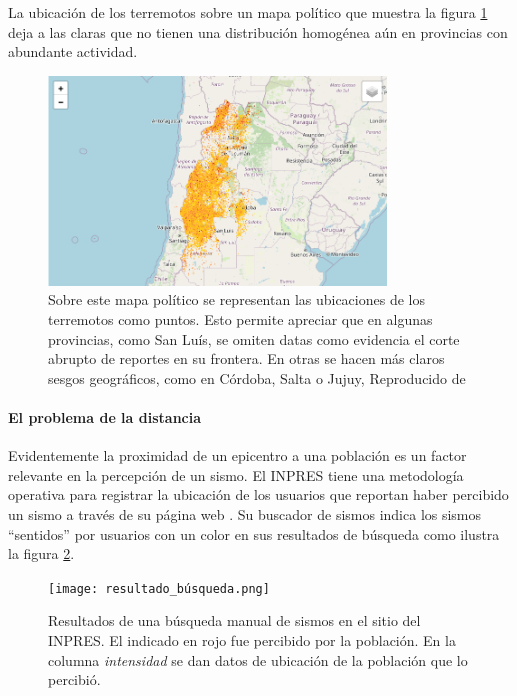 \documentclass[a4paper]{report}
\begin{document}
La ubicación de los terremotos sobre un mapa político que muestra la figura \ref{fig:terremotosMapa} deja a las claras que no tienen una distribución homogénea aún en provincias con abundante actividad.
\begin{figure}[!ht]
\centering
\includegraphics[width=0.8\textwidth]{terremotosMapa.png}
\caption{Sobre este mapa político se representan las ubicaciones de los terremotos como puntos. Esto permite apreciar que en algunas provincias, como San Luís, se omiten datas como evidencia el corte abrupto de reportes en su frontera. En otras se hacen más claros sesgos geográficos, como en Córdoba, Salta o Jujuy, 
Reproducido de \cite{daniela_parada_ic-datasets-docencia_nodate}}
\label{fig:terremotosMapa}
\end{figure}



\paragraph{El problema de la distancia}
Evidentemente la proximidad de un epicentro a una población es un factor relevante en la percepción de un sismo.
El INPRES tiene una metodología operativa para registrar la ubicación de los usuarios que reportan haber percibido un sismo a través de su página web \cite{noauthor_acerca_nodate}.
Su buscador de sismos indica los sismos ``sentidos'' por usuarios con un color en sus resultados de búsqueda como ilustra la figura \ref{fig:resultado_búsqueda}.

\begin{figure}[!ht]
\centering
\texttt{[image: resultado\_búsqueda.png]}
\caption{Resultados de una búsqueda manual de sismos en el sitio del INPRES. El indicado en rojo fue percibido por la población. En la columna \emph{intensidad} se dan datos de ubicación de la población que lo percibió.}
\label{fig:resultado_búsqueda}
\end{figure}
\end{document}
